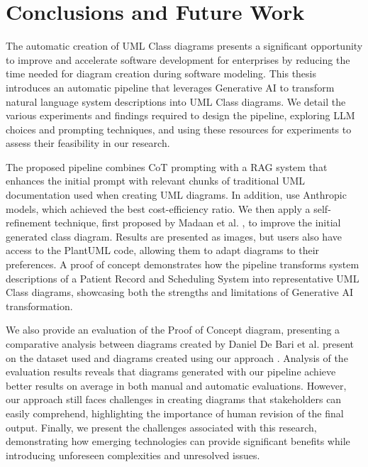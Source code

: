 
%

\chapter{Conclusions and Future Work}
\label{cha:conclusions}
The automatic creation of UML Class diagrams presents a significant opportunity to improve and accelerate software development for enterprises by reducing the time needed for diagram creation during software modeling. This thesis introduces an automatic pipeline that leverages Generative AI to transform natural language system descriptions into UML Class diagrams. We detail the various experiments and findings required to design the pipeline, exploring LLM choices and prompting techniques, and using these resources for experiments to assess their feasibility in our research.

The proposed pipeline combines CoT prompting with a RAG system that enhances the initial prompt with relevant chunks of traditional UML documentation used when creating UML diagrams. In addition, use Anthropic models, which achieved the best cost-efficiency ratio. We then apply a self-refinement technique, first proposed by Madaan et al. \cite{madaan2023selfrefineiterativerefinementselffeedback}, to improve the initial generated class diagram. Results are presented as images, but users also have access to the PlantUML code, allowing them to adapt diagrams to their preferences. A proof of concept demonstrates how the pipeline transforms system descriptions of a Patient Record and Scheduling System into representative UML Class diagrams, showcasing both the strengths and limitations of Generative AI transformation.

We also provide an evaluation of the Proof of Concept diagram, presenting a comparative analysis between diagrams created by Daniel De Bari et al. present on the dataset used and diagrams created using our approach \cite{DatasetDeBari2024}. Analysis of the evaluation results reveals that diagrams generated with our pipeline achieve better results on average in both manual and automatic evaluations. However, our approach still faces challenges in creating diagrams that stakeholders can easily comprehend, highlighting the importance of human revision of the final output. Finally, we present the challenges associated with this research, demonstrating how emerging technologies can provide significant benefits while introducing unforeseen complexities and unresolved issues.

